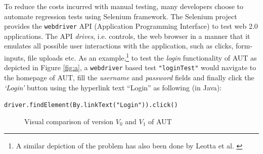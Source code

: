 To reduce the costs incurred with manual testing, many developers choose to automate regression tests using Selenium \cite{websiteSelenium} framework. The Selenium project provides the \texttt{webdriver} API (Application Programming Interface) to test web 2.0 applications. The API \textit{drives}, i.e. controls, the web browser in a manner that it emulates all possible user interactions with the application, such as clicks, form-inputs, file uploads etc. 
As an example,\footnote{A similar depiction of the problem has also been done by Leotta et al. \cite{leotta2013comparing}} to test the \textit{login} functionality of AUT as depicted in Figure \ref{fig:a}, a \texttt{webdriver} based test \texttt{"loginTest"} would navigate to the homepage of AUT, fill the \textit{username} and \textit{password} fields and finally click the \textit{`Login'} button using the hyperlink text ``Login'' as following (in Java):
\begin{small}
\texttt{driver.findElement(By.linkText("Login")).click()}
\end{small}


\begin{figure}[ht!]
\centering     %
{}
\vspace{-2mm}
\caption{Visual comparison of version $V_{0}$ and $V_{1}$ of AUT}
\label{fig:loginTest}
\end{figure} 



